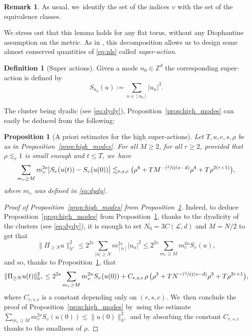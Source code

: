 \documentclass[10pt]{amsart}
\newcommand{\Psfrac}[2]{(\sfrac{#1}{#2})}
\theoremstyle{plain}
\newtheorem{proposition}[theorem]{Proposition}
\theoremstyle{definition}
\newtheorem{definition}[theorem]{Definition}
\newtheorem{remark}[theorem]{Remark}
\newcommand{\1}{\mathbf{1}}
\begin{document}
\begin{remark}
As usual, we~identify the set of the indices $\upsilon$ with the set of the equivalence classes.
\end{remark}

We stress out that this lemma holds for any flat torus, without any Diophantine assumption on the metric. As in \cite{BFM22}, this decomposition allows us to design some almost conserved quantities of \eqref{eq:nls} called \emph{super-action}.

\begin{definition}[Super actions] \label{def:super_actions} Given a mode $n_0\in \mathbb{Z}^d$ the corresponding super-action is defined by
\[
S_{n_0}(u) := \sum_{n\in[n_{0}]} |u_n|^2.
\]
\end{definition}

The cluster being dyadic (see \eqref{eq:dydy}), Proposition~\ref{prop:high_modes} can easily be deduced from the following:
\begin{proposition}[A priori estimates for the high super-actions]\label{prop:ap-hi} Let $T,u,c,s,\rho$ be as in Proposition~\ref{prop:high_modes}. For all $M \geq 2$,
for all $r\geq2$, provided that $\rho\lesssim_r 1$ is small enough and $t\leq T$, we~have
\begin{equation}
\label{eq:ap-hi}
\sum_{m_\upsilon \geq M} m_\upsilon^{2s} \big|S_{\upsilon}(u(t))-S_{\upsilon}(u(0))\big|
\lesssim_{r,s,c} \bigl(\rho^4 + TM^{-\Psfrac{\delta}{2}(s-d)} \rho^{4}+T \rho^{2(r+1)}\bigr),
\end{equation}
where $m_{\upsilon}$ was defined in \eqref{eq:dydy}.
\end{proposition}

\begin{proof}[Proof of Proposition~\ref{prop:high_modes} from Proposition~\ref{prop:ap-hi}] Indeed, to deduce Proposition~\ref{prop:high_modes} from Proposition~\ref{prop:ap-hi}, thanks to the dyadicity of the clusters (see \eqref{eq:dydy}), it is enough to set $N_0 = 3C(\mathscr{L},d)$ and $M=N/2$ to get that
\[
\| \Pi_{\geq N} u \|_{h^s}^2 \leq 2^{2s} \sum_{|n|\geq N} m_{[n]}^{2s} |u_n|^2 \leq 2^{2s} \sum_{ m_\upsilon \geq M} m_\upsilon^{2n} S_\upsilon(u),
\]
and so, thanks to Proposition~\ref{prop:ap-hi}, that
\[
\| \Pi_{\geq N} u(t) \|_{h^s}^2 \leq 2^{2s} \sum_{ m_\upsilon \geq M} m_\upsilon^{2n} S_\upsilon(u(0)) + C_{r,s,c} \, \rho \, \bigl(\rho^3 + TN^{-\Psfrac{\delta}{2}(s-d)} \rho^{3}+T \rho^{2r+1}\bigr),
\]
where $C_{r,s,c}$ is a constant depending only on $(r,s,c)$. We~then conclude the proof of Proposition~\ref{prop:high_modes} by~using the estimate $\sum_{ m_\upsilon \geq M} m_\upsilon^{2s} S_\upsilon(u(0)) \leq \|u(0) \|_{h^s}^2$ and by absorbing the constant $C_{r,s,c} $ thanks to the smallness of $\rho$.
\end{proof}
\end{document}
